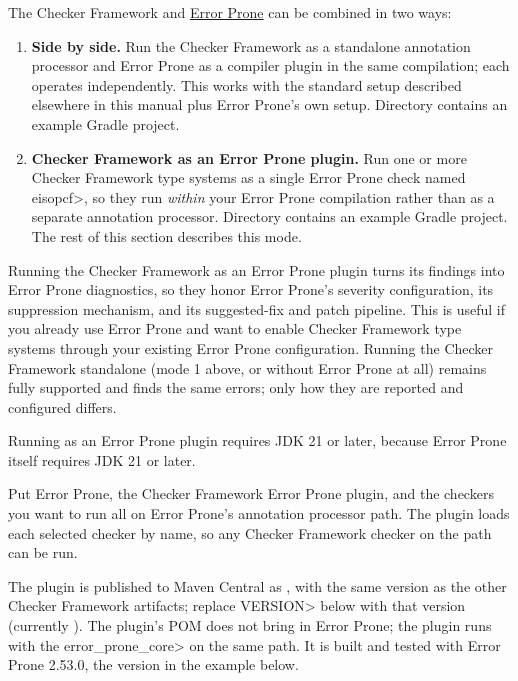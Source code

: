 The Checker Framework and \href{https://errorprone.info/}{Error Prone} can be combined in
two ways:

\begin{enumerate}
\item \textbf{Side by side.}  Run the Checker Framework as a standalone annotation
  processor and Error Prone as a compiler plugin in the same compilation; each operates
  independently.  This works with the standard setup described elsewhere in this manual
  plus Error Prone's own setup.  Directory  contains an
  example Gradle project.
\item \textbf{Checker Framework as an Error Prone plugin.}  Run one or more Checker
  Framework type systems as a single Error Prone check named \<eisopcf>, so they run
  \emph{within} your Error Prone compilation rather than as a separate annotation
  processor.  Directory  contains an example Gradle
  project.  The rest of this section describes this mode.
\end{enumerate}

Running the Checker Framework as an Error Prone plugin turns its findings into Error Prone
diagnostics, so they honor Error Prone's severity configuration, its suppression mechanism,
and its suggested-fix and patch pipeline.  This is useful if you already use Error Prone and
want to enable Checker Framework type systems through your existing Error Prone
configuration.  Running the Checker Framework standalone (mode 1 above, or without Error
Prone at all) remains fully supported and finds the same errors; only how they are reported
and configured differs.

Running as an Error Prone plugin requires JDK 21 or later, because Error Prone itself
requires JDK 21 or later.


Put Error Prone, the Checker Framework Error Prone plugin, and the checkers you want to
run all on Error Prone's annotation processor path.  The plugin loads each selected checker
by name, so any Checker Framework checker on the path can be run.

The plugin is published to Maven Central as ,
with the same version as the other Checker Framework artifacts; replace \<VERSION> below
with that version (currently \ReleaseVersion{}).  The plugin's POM does not bring in Error
Prone; the plugin runs with the \<error\_prone\_core> on the same path.  It is built and
tested with Error Prone 2.53.0, the version in the example below.

